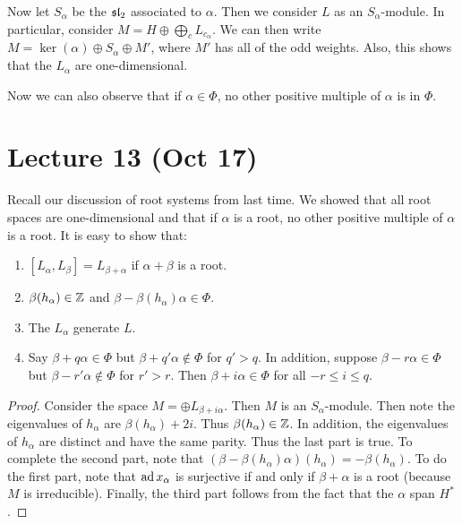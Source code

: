 \documentclass[twoside, 10pt]{article}
\begin{document}
    Now let $S_{\alpha}$ be the $\mathfrak{sl}_2$ associated to $\alpha$. Then we
    consider $L$ as an $S_{\alpha}$-module. In particular, consider $M = H
    \oplus \bigoplus_c L_{c_{\alpha}}$. We can then write $M = \ker(\alpha)
    \oplus S_{\alpha} \oplus M'$, where $M'$ has all of the odd weights. Also,
    this shows that the $L_{\alpha}$ are one-dimensional.

    Now we can also observe that if $\alpha \in \Phi$, no other positive
    multiple of $\alpha$ is in $\Phi$.

    \section{Lecture 13 (Oct 17)}%

    Recall our discussion of root systems from last time. We showed that all
    root spaces are one-dimensional and that if $\alpha$ is a root, no other
    positive multiple of $\alpha$ is a root. It is easy to show that:

    \begin{prop} \begin{enumerate} \item $[L_{\alpha},L_{\beta}] = L_{\beta +
        \alpha}$ if $\alpha + \beta$ is a root.  \item $\beta(h_{\alpha}) \in
        \mathbb{Z}$ and $\beta - \beta(h_{\alpha})\alpha \in \Phi$.  \item The
        $L_{\alpha}$ generate $L$.  \item Say $\beta + q\alpha \in \Phi$ but
        $\beta + q'\alpha \notin \Phi$ for $q' > q$. In addition, suppose
        $\beta - r\alpha \in \Phi$ but $\beta - r'\alpha \notin \Phi$ for $r' >
        r$. Then $\beta + i \alpha \in \Phi$ for all $-r \leq i \leq q$.
\end{enumerate} \end{prop}
    
    \begin{proof} Consider the space $M = \oplus L_{\beta + i \alpha}$. Then
        $M$ is an $S_{\alpha}$-module. Then note the eigenvalues of
        $h_{\alpha}$ are $\beta(h_{\alpha}) + 2i$. Thus $\beta(h_{\alpha}) \in
        \mathbb{Z}$. In addition, the eigenvalues of $h_{\alpha}$ are distinct and have
        the same parity. Thus the last part is true. To complete the second
        part, note that $(\beta - \beta(h_{\alpha})\alpha)(h_{\alpha}) =
        -\beta(h_{\alpha})$. To do the first part, note that $\operatorname{ad} x_{\alpha}$
        is surjective if and only if $\beta + \alpha$ is a root (because $M$ is
        irreducible). Finally, the third part follows from the fact that the
        $\alpha$ span $H^*$.  \end{proof}
\end{document}
